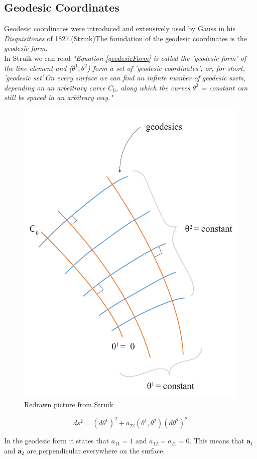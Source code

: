 \subsection{Geodesic Coordinates}

Geodesic coordinates were introduced and extensively used by Gauss in his \textit{Disquisitones} of 1827.(Struik)The foundation of the geodesic coordinates is the  \textit{geodesic form}.\\ 
In Struik we can read \textit{"Equation \ref{geodesicForm} is called the 'geodesic form' of the line element and ($\theta^1,\theta^2$) form a set of 'geodesic coordinates'; or, for short, 'geodesic set'.On every surface we can find an infinte number of geodesic szets, depending on an arbeitrary curve $C_0$, along which the curves $\theta^2$ = constant can still be spaced in an arbitrary way."}\\

\begin{figure}[H]
\centering
\includegraphics[height=0.8\linewidth ]{figure/Theory/geodesicCoordRe.pdf}
\caption{Redrawn picture from Struik }
\end{figure}


\begin{equation}\label{geodesicForm}
    ds^2 = (d\theta^1)^2 + a_{22}(\theta^1,\theta^2)(d\theta^2)^2
\end{equation}

In the geodesic form it states that $a_{11} = 1$ and $a_{12}=a_{21} = 0$. This means that $\textbf{a}_1$ and $\textbf{a}_2$ are perpendicular everywhere on the surface. 

